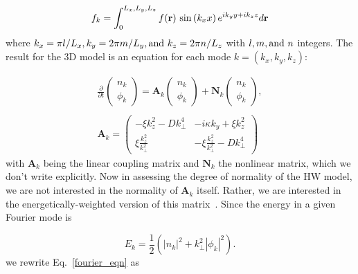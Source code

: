 \documentclass[twocolumn,showkeys,superscriptaddress]{revtex4}
\def\beq{\begin{equation}}
\def\eeq{\end{equation}}
\def\beqar{\begin{eqnarray}}
\def\eeqar{\end{eqnarray}}
\begin{document}
\beq
\label{fourier_form}
f_k = \int_0^{L_x,L_y,L_z} f(\mathbf{r}) \ {\rm sin} \left( k_x x \right) e^{i k_y y + i k_z z} d\mathbf{r}
\eeq
where $k_x = \pi l/L_x, k_y = 2 \pi m/L_y, {\rm and } \ k_z = 2 \pi n/L_z$ with $l, m, {\rm and } \ n$ integers.
The result for the 3D model is an equation for each mode $k = (k_x,k_y,k_z)$:

\beqar
\label{fourier_eqn}
\frac{\partial}{\partial t} \left( \begin{array}{cc} n_k \\ \phi_k \end{array} \right) = \mathbf{A}_k \left( \begin{array}{cc} n_k \\ \phi_k \end{array} \right) + \mathbf{N}_k \left( \begin{array}{cc} n_k \\ \phi_k \end{array} \right), \\ \nonumber \\
\label{A_k}
\mathbf{A}_k = \left( \begin{array}{cc} -\xi k_z^2 - D k_\perp^4 & -i \kappa k_y + \xi k_z^2 \\  \xi \frac{k_z^2}{k_\perp^2} & - \xi \frac{k_z^2}{k_\perp^2} - D k_\perp^4\end{array} \right)
\eeqar
with $\mathbf{A}_k$ being the linear coupling matrix and $\mathbf{N}_k$ the nonlinear matrix, which we don't write explicitly. 
Now in assessing the degree of normality of the HW model, we are not interested in the normality of $\mathbf{A}_k$ itself. 
Rather, we are interested in the energetically-weighted version of this matrix~\cite{camargo1998,schmid2007,camporeale2010}. Since the energy in a given Fourier mode is

\beq
\label{en_def}
E_k =  \frac{1}{2} \left( |n_k|^2 + k_\perp^2 |\phi_k|^2 \right).
\eeq
we rewrite Eq.~\ref{fourier_eqn} as
\end{document}
